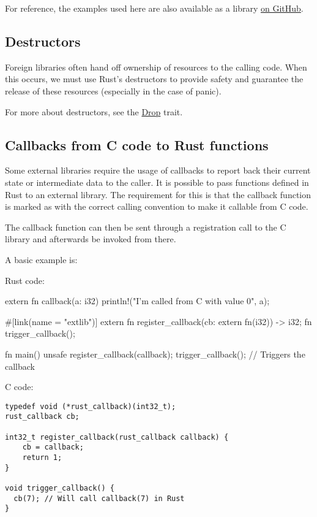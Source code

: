 For reference, the examples used here are also available as a library \href{https://github.com/thestinger/rust-snappy}{on GitHub}.

\subsection*{Destructors}

Foreign libraries often hand off ownership of resources to the calling code. When this occurs, we must use Rust's 
destructors to provide safety and guarantee the release of these resources (especially in the case of panic).

\blank

For more about destructors, see the \href{https://doc.rust-lang.org/std/ops/trait.Drop.html}{Drop} trait.

\subsection*{Callbacks from C code to Rust functions}

Some external libraries require the usage of callbacks to report back their current state or intermediate data to 
the caller. It is possible to pass functions defined in Rust to an external library. The requirement for this is that 
the callback function is marked as  with the correct calling convention to make it callable from C code.

\blank

The callback function can then be sent through a registration call to the C library and afterwards be invoked from there.

\blank

A basic example is:

\blank

Rust code:

\begin{rustc}
extern fn callback(a: i32) {
    println!("I'm called from C with value {0}", a);
}

#[link(name = "extlib")]
extern {
   fn register_callback(cb: extern fn(i32)) -> i32;
   fn trigger_callback();
}

fn main() {
    unsafe {
        register_callback(callback);
        trigger_callback(); // Triggers the callback
    }
}
\end{rustc}

C code:

\begin{verbatim}
typedef void (*rust_callback)(int32_t);
rust_callback cb;

int32_t register_callback(rust_callback callback) {
    cb = callback;
    return 1;
}

void trigger_callback() {
  cb(7); // Will call callback(7) in Rust
}
\end{verbatim}

